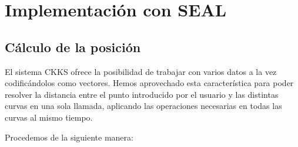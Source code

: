 \section{Implementación con SEAL}

\subsection{Cálculo de la posición}

El sistema CKKS ofrece la posibilidad de trabajar con varios datos a la vez codificándolos como vectores. Hemos aprovechado esta característica para poder resolver la distancia entre el punto introducido por el usuario y las distintas curvas en una sola llamada, aplicando las operaciones necesarias en todas las curvas al mismo tiempo.

Procedemos de la siguiente manera:

